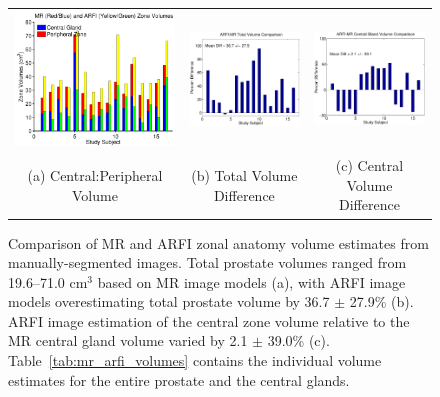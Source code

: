 \begin{figure}[htb!]
\centering
\begin{tabular}{ccc}
\includegraphics[width=0.3\linewidth]{figs/mr_arfi_volumes} &
\includegraphics[width=0.3\linewidth]{figs/mr_arfi_volume_diff} &
\includegraphics[width=0.3\linewidth]{figs/mr_arfi_central_diff} \\
(a) Central:Peripheral Volume & (b) Total Volume Difference & (c) Central Volume Difference\\
\end{tabular}
\caption{Comparison of MR and ARFI zonal anatomy volume estimates from
    manually-segmented images.  Total prostate volumes ranged from 19.6--71.0
    cm$^3$ based on MR image models (a), with ARFI image models overestimating
    total prostate volume by 36.7 $\pm$ 27.9\% (b).  ARFI image estimation of
    the central zone volume relative to the MR central gland volume varied by
    2.1 $\pm$ 39.0\% (c).  Table~\ref{tab:mr_arfi_volumes} contains the
    individual volume estimates for the entire prostate and the central
    glands.}
\label{fig:mr_arfi_volumes} 
\end{figure}
